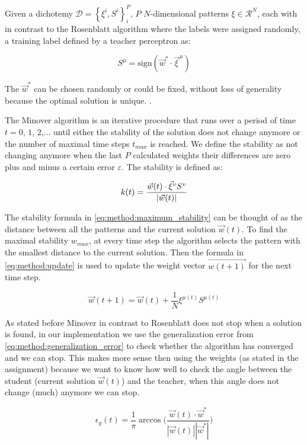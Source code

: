 Given a dichotemy $\mathcal{D} = \left\{\xi^i, S^i \right\}_{i}^{P}$, $P$ $N$-dimensional patterns $\xi \in \mathcal{R}^N$, each with in contrast to the Rosenblatt algorithm where the labels were assigned randomly, a training label defined by a teacher perceptron as:

\begin{equation}\label{eq:method:teacher_label}
	S^\mu = \text{sign}(\vec{w}^* \cdot {\vec{\xi}}^{\mu})
\end{equation}

The $\vec{w}^*$ can be chosen randomly or could be fixed, without loss of generality because the optimal solution is unique. .

The Minover algorithm is an iterative procedure that runs over a period of time $t = 0$, $1$, $2$,... until either the stability of the solution does not change anymore or the number of maximal time steps $t_{max}$ is reached. We define the stability as not changing anymore when the last $P$ calculated weights their differences are zero plus and minus a certain error $\varepsilon$. The  stability is defined as: 

\begin{equation}\label{eq:method:maximum_stability}
\mathnormal{k}(t) = \frac{\vec{w}(t) \cdot \vec{\xi}^v S^v}{|\vec{w}(t)|}
\end{equation} 

The stability formula in \eqref{eq:method:maximum_stability} can be thought of as the distance between all the patterns and the current solution $\vec{w}(t)$. To find the maximal stability $w_{max}$, at every time step the algorithm selects the pattern with the smallest distance to the current solution. Then the formula in \eqref{eq:method:update} is used to update the weight vector $\vec{w(t + 1)}$ for the next time step.

\begin{equation}\label{eq:method:update}
	\vec{w}(t + 1) = \vec{w}(t) + \frac{1}{N} \xi^{\mu(t)} S^{\mu(t)} 
\end{equation}

As stated before Minover in contrast to Rosenblatt does not stop when a solution is found, in our implementation we use the generalization error from \eqref{eq:method:generalization_error} to check whether the algorithm has converged and we can stop. This makes more sense then using the weights (as stated in the assignment) because we want to know how well to check the angle between the student (current solution $\vec{w}(t)$) and the teacher, when this angle does not change (much) anymore we can stop.  

\begin{equation}\label{eq:method:generalization_error}
	\epsilon_g(t) = \frac{1}{\pi} \arccos \bigg(\frac{\vec{w}(t) \cdot \vec{w}^*}{|\vec{w}(t)| |\vec{w}^*|}\bigg)
\end{equation}


